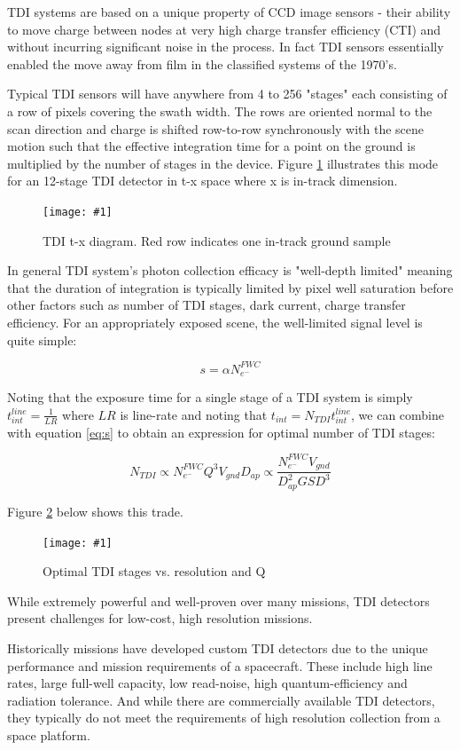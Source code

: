 \documentclass[10pt,journal]{IEEEtran}  %
\newcommand{\includefigure}[3]
{
  \begin{figure}[h!]
  \centering
  \texttt{[image: \#1]}
  \caption[]{#3}
  \label{#2}
  \end{figure}
}
\begin{document}
{TDI systems are based on a unique property of CCD image sensors - their ability to move charge between nodes at very high charge transfer efficiency (CTI) and without incurring significant noise in the process.  In fact TDI sensors essentially enabled the move away from film in the classified systems of the 1970's.

Typical TDI sensors will have anywhere from 4 to 256 "stages" each consisting of a row of pixels covering the swath width.  The rows are oriented normal to the scan direction and charge is shifted row-to-row synchronously with the scene motion such that the effective integration time for a point on the ground is multiplied by the number of stages in the device.  Figure \ref{fig:tdi} illustrates this mode for an 12-stage TDI detector in t-x space where x is in-track dimension.

\includefigure{figures/tdi.pgf}{fig:tdi}{TDI t-x diagram.  Red row indicates one in-track ground sample}

In general TDI system's photon collection efficacy is "well-depth limited" meaning that the duration of integration is typically limited by pixel well saturation before other factors such as number of TDI stages, dark current, charge transfer efficiency.  For an appropriately exposed scene, the well-limited signal level is quite simple:

\begin{equation}
s = \alpha N_{e^-}^{FWC}
\label{eq:well_limited}
\end{equation}

Noting that the exposure time for a single stage of a TDI system is simply $t_{int}^{line} = \frac{1}{LR}$ where $LR$ is line-rate and noting that $t_{int} = N_{TDI}t_{int}^{line}$, we can combine with equation \ref{eq:s} to obtain an expression for optimal number of TDI stages:

\begin{equation}
N_{TDI} \propto N_{e^-}^{FWC} Q^3 V_{gnd}D_{ap} \propto \frac{N_{e^-}^{FWC}V_{gnd}}{D_{ap}^2 GSD^3}
\label{eq:n_tdi}
\end{equation}

Figure \ref{fig:n_tdi} below shows this trade.

\includefigure{figures/N_tdi.pgf}{fig:n_tdi}{Optimal TDI stages vs. resolution and Q}

While extremely powerful and well-proven over many missions, TDI detectors present challenges for low-cost, high resolution missions.

Historically missions have developed custom TDI detectors due to the unique performance and mission requirements of a spacecraft\cite{jerram}.  These include high line rates, large full-well capacity, low read-noise, high quantum-efficiency and radiation tolerance.  And while there are commercially available TDI detectors, they typically do not meet the requirements of high resolution collection from a space platform.

}
\end{document}

